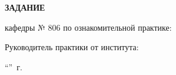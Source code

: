 \begin{center}
\bfseries{\large ЗАДАНИЕ}
\end{center}

кафедры № 806 по ознакомительной практике:

\vspace*{\fill}
Руководитель практики от института:

\vspace{5pt}
\enquote{\hspace{0.5cm}}  \the\year\,г.\hfill {}
\pagebreak

